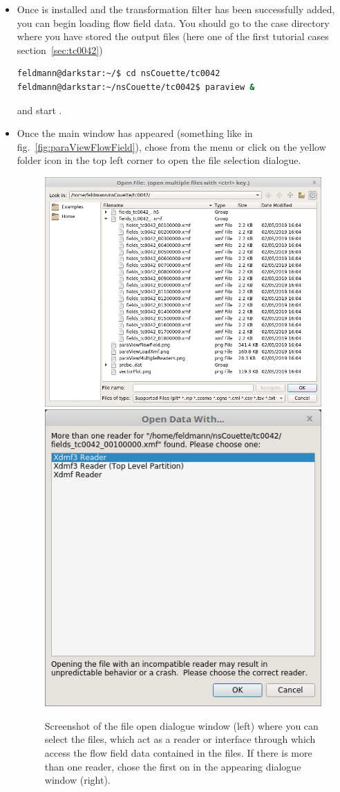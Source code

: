\documentclass[a4paper, 11pt, DIV=11]{scrartcl}
\begin{document}
\begin{itemize}
\item
Once \paraview is installed and the transformation filter has been successfully
added, you can begin loading flow field data. You should go to the case
directory where you have stored the \hdf output files (here one of the first
tutorial cases section~\ref{sec:tc0042})
\begin{lstlisting}[language=bash]
feldmann@darkstar:~/$ cd nsCouette/tc0042
feldmann@darkstar:~/nsCouette/tc0042$ paraview &
\end{lstlisting}
and start \paraview.
\item
Once the \paraview main window has appeared (something like in
fig.~\ref{fig:paraViewFlowField}), chose from the menu 
or click on the yellow folder icon in the top left corner to open the file
selection dialogue.
\begin{figure}[htb]
\centering
\includegraphics[height=0.42\linewidth]{figures/paraViewLoadXmf.png}\hfill
\includegraphics[height=0.42\linewidth]{figures/paraViewMultipleReaders.png}
\caption{Screenshot of the file open dialogue window (left) where you
can select the  \xmf files, which act as a reader or interface
through which  \paraview access the flow field data contained in
the \hdf files. If there is more than one  \xmf reader, chose the
first on in the appearing dialogue window (right).}
\label{fig:paraViewFlowFieldLoadXmf}
\end{figure}

\end{itemize}
\end{document}
